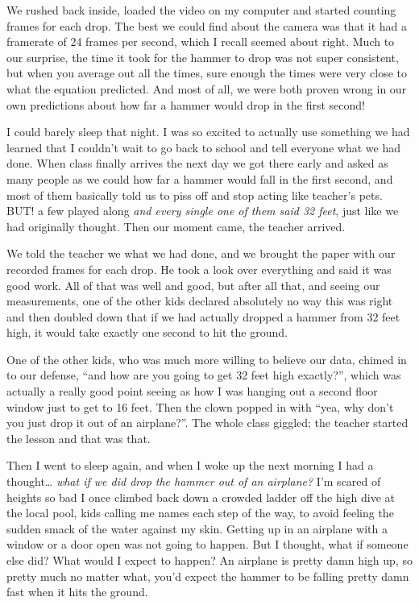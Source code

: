 \documentclass[]{book}
\begin{document}
We rushed back inside, loaded the video on my computer and started counting frames for each drop. The best we could find about the camera was that it had a framerate of 24 frames per second, which I recall seemed about right. Much to our surprise, the time it took for the hammer to drop was not super consistent, but when you average out all the times, sure enough the times were very close to what the equation predicted. And most of all, we were both proven wrong in our own predictions about how far a hammer would drop in the first second!

I could barely sleep that night. I was so excited to actually use something we had learned that I couldn't wait to go back to school and tell everyone what we had done. When class finally arrives the next day we got there early and asked as many people as we could how far a hammer would fall in the first second, and most of them basically told us to piss off and stop acting like teacher's pets. BUT! a few played along \emph{and every single one of them said 32 feet}, just like we had originally thought. Then our moment came, the teacher arrived.

We told the teacher we what we had done, and we brought the paper with our recorded frames for each drop. He took a look over everything and said it was good work. All of that was well and good, but after all that, and seeing our measurements, one of the other kids declared absolutely no way this was right and then doubled down that if we had actually dropped a hammer from 32 feet high, it would take exactly one second to hit the ground.

One of the other kids, who was much more willing to believe our data, chimed in to our defense, ``and how are you going to get 32 feet high exactly?'', which was actually a really good point seeing as how I was hanging out a second floor window just to get to 16 feet. Then the clown popped in with ``yea, why don't you just drop it out of an airplane?''. The whole class giggled; the teacher started the lesson and that was that.

Then I went to sleep again, and when I woke up the next morning I had a thought\ldots{} \emph{what if we did drop the hammer out of an airplane?} I'm scared of heights so bad I once climbed back down a crowded ladder off the high dive at the local pool, kids calling me names each step of the way, to avoid feeling the sudden smack of the water against my skin. Getting up in an airplane with a window or a door open was not going to happen. But I thought, what if someone else did? What would I expect to happen? An airplane is pretty damn high up, so pretty much no matter what, you'd expect the hammer to be falling pretty damn fast when it hits the ground.
\end{document}

